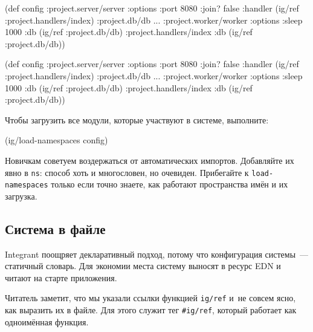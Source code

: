 \ifnarrow

\begin{english}
  \begin{clojure}
(def config
  {:project.server/server
   {:options {:port 8080 :join? false}
    :handler (ig/ref
               :project.handlers/index)}
   :project.db/db {...}
   :project.worker/worker
     {:options {:sleep 1000}
      :db      (ig/ref :project.db/db)}
   :project.handlers/index
     {:db (ig/ref :project.db/db)}})
  \end{clojure}
\end{english}

\else

\begin{english}
  \begin{clojure}
(def config
  {:project.server/server
   {:options {:port 8080 :join? false}
    :handler (ig/ref :project.handlers/index)}
   :project.db/db {...}
   :project.worker/worker
     {:options {:sleep 1000}
      :db      (ig/ref :project.db/db)}
   :project.handlers/index
     {:db (ig/ref :project.db/db)}})
  \end{clojure}
\end{english}

\fi

\noindent
Чтобы загрузить все модули, которые участвуют в системе, выполните:

\begin{english}
  \begin{clojure}
(ig/load-namespaces config)
  \end{clojure}
\end{english}

Новичкам советуем воздержаться от автоматических импортов. Добавляйте их явно в
\verb|ns|: способ хоть и многословен, но очевиден. Прибегайте к
\verb|load-namespaces| только если точно знаете, как работают пространства
имён и их загрузка.

\subsection{Система в файле}


Integrant поощряет декларативный подход, потому что конфигурация системы~---
статичный словарь. Для экономии места систему выносят в ресурс EDN и читают на
старте приложения.


Читатель заметит, что мы указали ссылки функцией \verb|ig/ref| и~не совсем ясно,
как выразить их в файле. Для этого служит тег \verb|#ig/ref|, который работает
как одноимённая функция.

